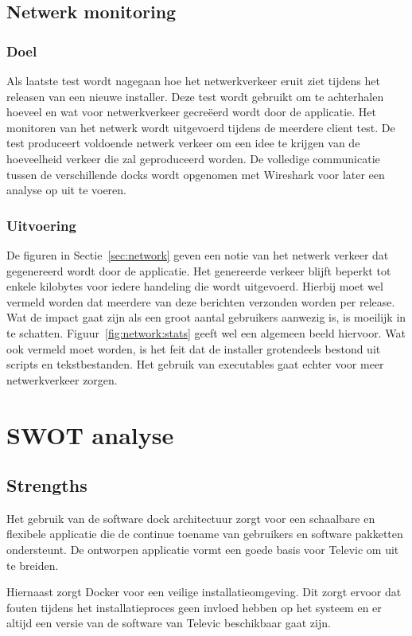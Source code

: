 \subsection{Netwerk monitoring}
\subsubsection{Doel}
Als laatste test wordt nagegaan hoe het netwerkverkeer eruit ziet tijdens het releasen van een nieuwe installer.
Deze test wordt gebruikt om te achterhalen hoeveel en wat voor netwerkverkeer gecreëerd wordt door de applicatie.
Het monitoren van het netwerk wordt uitgevoerd tijdens de meerdere client test.
De test produceert voldoende netwerk verkeer om een idee te krijgen van de hoeveelheid verkeer die zal geproduceerd worden.
De volledige communicatie tussen de verschillende docks wordt opgenomen met Wireshark voor later een analyse op uit te voeren.

\subsubsection{Uitvoering}
De figuren in Sectie~\ref{sec:network} geven een notie van het netwerk verkeer dat gegenereerd wordt door de applicatie.
Het genereerde verkeer blijft beperkt tot enkele kilobytes voor iedere handeling die wordt uitgevoerd.
Hierbij moet wel vermeld worden dat meerdere van deze berichten verzonden worden per release.
Wat de impact gaat zijn als een groot aantal gebruikers aanwezig is, is moeilijk in te schatten.
Figuur~\ref{fig:network:stats} geeft wel een algemeen beeld hiervoor.
Wat ook vermeld moet worden, is het feit dat de installer grotendeels bestond uit scripts en tekstbestanden.
Het gebruik van executables gaat echter voor meer netwerkverkeer zorgen.

\section{SWOT analyse}
\subsection{Strengths}
Het gebruik van de software dock architectuur zorgt voor een schaalbare en flexibele applicatie die de continue toename van gebruikers en software pakketten ondersteunt.
De ontworpen applicatie vormt een goede basis voor Televic om uit te breiden.

Hiernaast zorgt Docker voor een veilige installatieomgeving.
Dit zorgt ervoor dat fouten tijdens het installatieproces geen invloed hebben op het systeem en er altijd een versie van de software van Televic beschikbaar gaat zijn.

